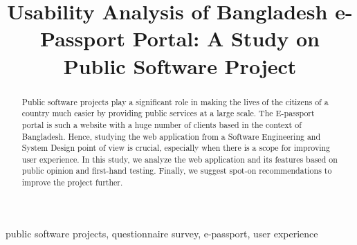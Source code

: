 \documentclass[conference]{IEEEtran}
\begin{document}
\title{Usability Analysis of Bangladesh e-Passport Portal: A Study on Public Software Project}

\author{
}


\maketitle
\thispagestyle{plain}
\pagestyle{plain}
\begin{abstract}
Public software projects play a significant role in making the lives of the citizens of a country much easier by providing public services at a large scale. The E-passport portal is such a website with a huge number of clients based in the context of Bangladesh. Hence, studying the web application from a Software Engineering and System Design point of view is crucial, especially when there is a scope for improving user experience. In this study, we analyze the web application and its features based on public opinion and first-hand testing. Finally, we suggest spot-on recommendations to improve the project further.
\end{abstract}

\begin{IEEEkeywords}
public software projects, questionnaire survey, e-passport, user experience
\end{IEEEkeywords}



% 
% 






% 
% 
% 



\end{document}
